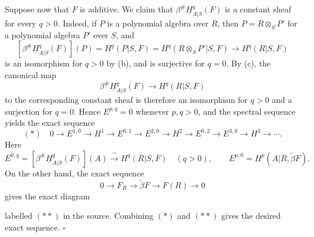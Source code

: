 Suppose now that $F$ is additive. We claim that
$\beta^{\#}\underline H^q_{A|S}(F)$ is a constant sheaf for every
$q>0$. Indeed, if $P$ is a polynomial algebra over $R$, then
$P=R\otimes_SP'$ for a polynomial algebra $P'$ over $S$, and
\[
 [\beta^{\#}\underline H^q_{A|S}(F)](P)
 =H^q(P|S,F)
 =H^q(R\otimes_SP'|S,F)
 \longrightarrow H^q(R|S,F)
\]
is an isomorphism for $q>0$ by (b), and is surjective for $q=0$.
By (c), the canonical map
\[
 \beta^{\#}\underline H^q_{A|S}(F)
 \longrightarrow H^q(R|S,F)
\]
to the corresponding constant sheaf is therefore an isomorphism
for $q>0$ and a surjection for $q=0$. Hence $E^{p,q}=0$ whenever
$p,q>0$, and the spectral sequence yields the exact sequence
\[
 (*)\quad
 0\longrightarrow E^{1,0}\longrightarrow H^1
 \longrightarrow E^{0,1}\longrightarrow E^{2,0}
 \longrightarrow H^2\longrightarrow E^{0,2}
 \longrightarrow E^{3,0}\longrightarrow H^3\longrightarrow\cdots.
\]
Here
\[
 E^{0,q}=[\beta^{\#}\underline H^q_{A|S}(F)](A)
 \xrightarrow{\ \sim\ }H^q(R|S,F)\quad(q>0),
 \qquad
 E^{p,0}=H^p(A|R,\widetilde\beta F).
\]
On the other hand, the exact sequence
\[
 0\longrightarrow F_R\longrightarrow\widetilde\beta F
 \longrightarrow F(R)\longrightarrow0
\]
gives the exact diagram
\begin{center}
\scriptsize
{}
\end{center}
labelled $(**)$ in the source. Combining $(*)$ and $(**)$ gives
the desired exact sequence. \hfill$\square$
